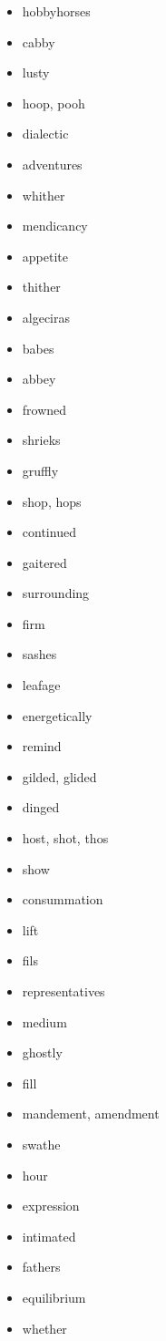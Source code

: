 \documentclass{article}
\begin{document}
\begin{itemize}
    \item hobbyhorses
    \item cabby
    \item lusty
    \item hoop, pooh
    \item dialectic
    \item adventures
    \item whither
    \item mendicancy
    \item appetite
    \item thither
    \item algeciras
    \item babes
    \item abbey
    \item frowned
    \item shrieks
    \item gruffly
    \item shop, hops
    \item continued
    \item gaitered
    \item surrounding
    \item firm
    \item sashes
    \item leafage
    \item energetically
    \item remind
    \item gilded, glided
    \item dinged
    \item host, shot, thos
    \item show
    \item consummation
    \item lift
    \item fils
    \item representatives
    \item medium
    \item ghostly
    \item fill
    \item mandement, amendment
    \item swathe
    \item hour
    \item expression
    \item intimated
    \item fathers
    \item equilibrium
    \item whether

\end{itemize}
\end{document}

